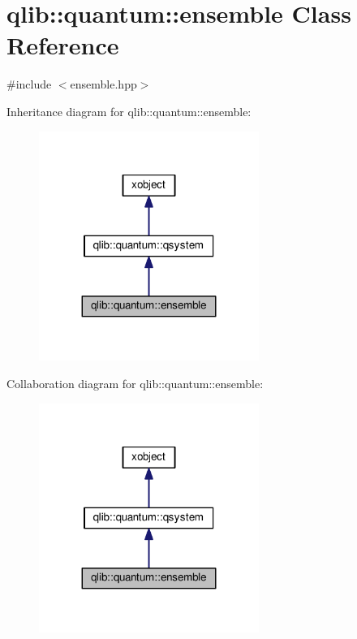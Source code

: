 \hypertarget{classqlib_1_1quantum_1_1ensemble}{}\section{qlib\+:\+:quantum\+:\+:ensemble Class Reference}
\label{classqlib_1_1quantum_1_1ensemble}


{\ttfamily \#include $<$ensemble.\+hpp$>$}



Inheritance diagram for qlib\+:\+:quantum\+:\+:ensemble\+:\nopagebreak
\begin{figure}[H]
\begin{center}
\leavevmode
\includegraphics[width=203pt]{classqlib_1_1quantum_1_1ensemble__inherit__graph}
\end{center}
\end{figure}


Collaboration diagram for qlib\+:\+:quantum\+:\+:ensemble\+:\nopagebreak
\begin{figure}[H]
\begin{center}
\leavevmode
\includegraphics[width=203pt]{classqlib_1_1quantum_1_1ensemble__coll__graph}
\end{center}
\end{figure}

